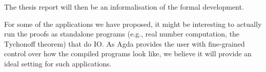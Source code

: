 \documentclass{article}
\begin{document}
The thesis report will then be an informalisation of the formal development.

For some of the applications we have proposed, it might be interesting to actually run the
proofs as standalone programs (e.g., real number computation, the Tychonoff theorem) that
do IO. As Agda provides the user with fine-grained control over how the compiled programs
look like, we believe it will provide an ideal setting for such applications.



\end{document}
